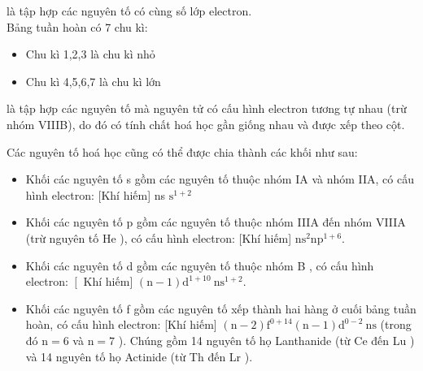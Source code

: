\begin{ghinho}
	 là tập hợp các nguyên tố có cùng số lớp electron.\\
	Bảng tuần hoàn có 7 chu kì:
	\begin{itemize}
		\item Chu kì 1,2,3 là chu kì nhỏ
		\item Chu kì 4,5,6,7 là chu kì lớn
	\end{itemize}
	\begin{center}
	\end{center}
\end{ghinho}
\begin{ghinho}
	 là tập hợp các nguyên tố mà nguyên tử có cấu hình electron tương tự nhau (trừ nhóm VIIIB), do đó có tính chất hoá học gần giống nhau và được xếp theo cột.
		\begin{center}
		\end{center}
\end{ghinho}
\begin{tomtat}
	Các nguyên tố hoá học cũng có thể được chia thành các khối như sau:
	\begin{itemize}
		\item  Khối các nguyên tố s gồm các nguyên tố thuộc nhóm IA và nhóm IIA, có cấu hình electron: [Khí hiếm] ns $\mathrm{s}^{1+2}$
		\item  Khối các nguyên tố p gồm các nguyên tố thuộc nhóm IIIA đến nhóm VIIIA (trừ nguyên tố He ), có cấu hình electron: [Khí hiếm] $\mathrm{ns}^2 \mathrm{np}^{1+6}$.
		\item  Khối các nguyên tố d gồm các nguyên tố thuộc nhóm B , có cấu hình electron: $\left[\right.$ Khí hiếm] $(\mathrm{n}-1) \mathrm{d}^{1+10} \mathrm{~ns}^{1+2}$.
		\item  Khối các nguyên tố f gồm các nguyên tố xếp thành hai hàng ở cuối bảng tuần hoàn, có cấu hình electron: [Khí hiếm] $(\mathrm{n}-2) \mathrm{f}^{0+14}(\mathrm{n}-1) \mathrm{d}^{0-2} \mathrm{~ns}$ (trong đó $\mathrm{n}=6$ và $\mathrm{n}=7$ ). Chúng gồm 14 nguyên tố họ Lanthanide (từ Ce đến Lu ) và 14 nguyên tố họ Actinide (từ Th đến Lr ).
	\end{itemize}
\end{tomtat}
